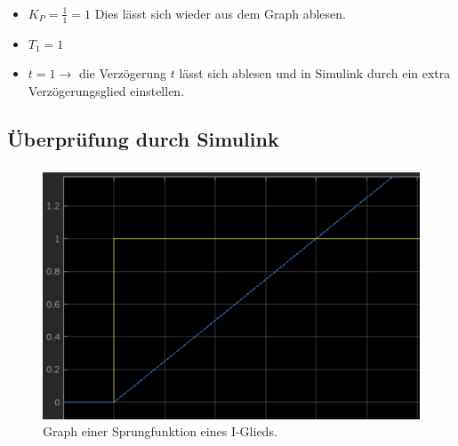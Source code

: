 \documentclass{article}
\begin{document}
			\subsubsection{}
				\begin{itemize}
					\item $K_P = \frac{1}{1} = 1$ Dies lässt sich wieder aus dem Graph ablesen.
					\item $T_1 = 1$
					\item $t = 1 \rightarrow$ die Verzögerung $t$ lässt sich ablesen und in Simulink durch ein extra Verzögerungsglied einstellen.
				\end{itemize}
\newpage
		\subsection{Überprüfung durch Simulink}
			\subsubsection{}
				\begin{figure}[h]
					\includegraphics[scale=0.22, center]{./Sprungfunktion_I_Glied.png}
					\caption{Graph einer Sprungfunktion eines I-Glieds.}
					\label{fig1: Springfunktion-I-Glied}
				\end{figure}	
\end{document}
